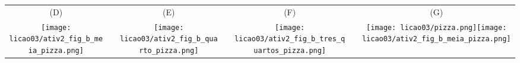 \begin{atividade}{}
\begin{center}
\begin{tabular}{ccccccc}
(D)&\quad\quad\quad & (E) &\quad\quad\quad&  (F) &\quad\quad\quad&  (G) \\
 \texttt{[image: licao03/ativ2\_fig\_b\_meia\_pizza.png]} & & \texttt{[image: licao03/ativ2\_fig\_b\_quarto\_pizza.png]} & &\texttt{[image: licao03/ativ2\_fig\_b\_tres\_quartos\_pizza.png]} & &\texttt{[image: licao03/pizza.png]}\texttt{[image: licao03/ativ2\_fig\_b\_meia\_pizza.png]}
\end{tabular}
\end{center}

\end{atividade}

